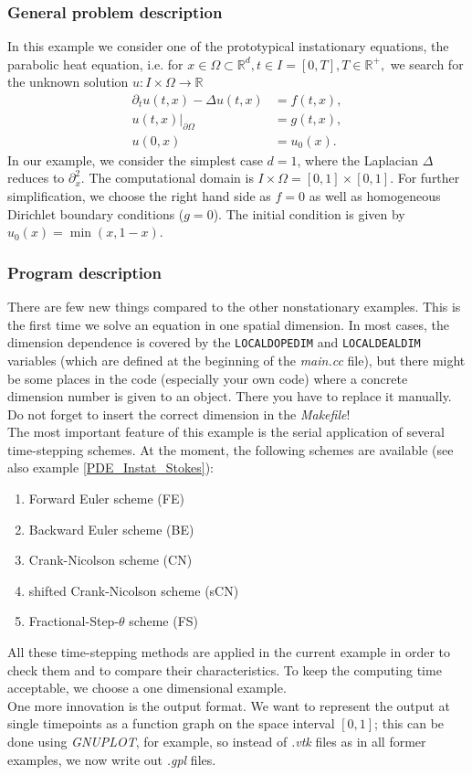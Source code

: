 \subsubsection{General problem description}

In this example we consider one of the prototypical instationary equations, the parabolic heat equation, i.e. for $x \in \Omega \subset \mathbb{R}^d, t\in I =[0,T], T\in \mathbb{R}^+,$ we search for the unknown solution $u:I \times \Omega \rightarrow \mathbb{R}$
\begin{align*}
\partial_t u(t,x) - \Delta u(t,x) &= f(t,x),\\
u(t,x)|_{\partial \Omega} &= g(t,x),\\
u(0,x) &= u_0(x).
\end{align*} In our example, we consider the simplest case $d=1$, where the Laplacian $\Delta$ reduces to $\partial_x^2$. The computational domain is $ I\times \Omega = [0,1] \times [0,1]$. For further simplification, we choose the right hand side as $f=0$ as well as homogeneous Dirichlet boundary conditions ($g=0$). The initial condition is given by $u_0(x) = \min(x,1-x)$.

\subsubsection{Program description}

There are few new things compared to the other nonstationary examples. This is the first time we solve an equation in one spatial dimension. In most cases, the dimension dependence is covered by the \texttt{LOCALDOPEDIM} and \texttt{LOCALDEALDIM} variables (which are defined at the beginning of the \textit{main.cc} file), but there might be some places in the code (especially your own code) where a concrete dimension number is given to an object. There you have to replace it manually. Do not forget to insert the correct dimension in the \textit{Makefile}!\\
The most important feature of this example is the serial application of several time-stepping schemes. At the moment, the following schemes are available (see also example \ref{PDE_Instat_Stokes}):
\begin{enumerate}
\item
Forward Euler scheme (FE)
\item
Backward Euler scheme (BE)
\item
Crank-Nicolson scheme (CN)
\item
shifted Crank-Nicolson scheme (sCN)
\item
Fractional-Step-$\theta$ scheme (FS)
\end{enumerate}
All these time-stepping methods are applied in the current example in order to check them and to compare their characteristics. To keep the computing time acceptable, we choose a one dimensional example.\\
One more innovation is the output format. We want to represent the output at single timepoints as a function graph on the space interval $[0,1]$; this can be done using \textit{GNUPLOT}, for example, so instead of \textit{.vtk} files as in all former examples, we now write out \textit{.gpl} files.